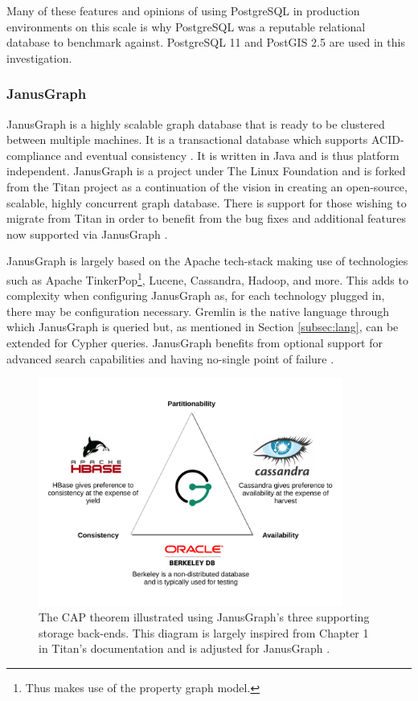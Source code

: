 Many of these features and opinions of using PostgreSQL in production environments on this scale is why PostgreSQL was a reputable relational database to benchmark against. PostgreSQL 11 and PostGIS 2.5 are used in this investigation.

\subsubsection{JanusGraph}

JanusGraph is a highly scalable graph database that is ready to be clustered between multiple machines. It is a transactional database which supports ACID-compliance and eventual consistency \cite{janusgraphMain}. It is written in Java and is thus platform independent. JanusGraph is a project under The Linux Foundation and is forked from the Titan project as a continuation of the vision in creating an open-source, scalable, highly concurrent graph database. There is support for those wishing to migrate from Titan in order to benefit from the bug fixes and additional features now supported via JanusGraph \cite{janusgraphTitan}.

JanusGraph is largely based on the Apache tech-stack making use of technologies such as Apache TinkerPop\footnote{Thus makes use of the property graph model.}, Lucene, Cassandra, Hadoop, and more. This adds to complexity when configuring JanusGraph as, for each technology plugged in, there may be configuration necessary. Gremlin is the native language through which JanusGraph is queried but, as mentioned in Section \ref{subsec:lang}, can be extended for Cypher queries. JanusGraph benefits from optional support for advanced search capabilities and having no-single point of failure \cite{janusgraphDocs}.

\begin{figure}[h]
    \centering
    \includegraphics[width=10cm]{img/5_designFigures/cap.pdf}
    \caption{The CAP theorem illustrated using JanusGraph's three supporting storage back-ends. This diagram is largely inspired from Chapter 1 in Titan's documentation and is adjusted for JanusGraph \cite{titanCap}.}
    \label{fig:janusgraphCap}
\end{figure}

